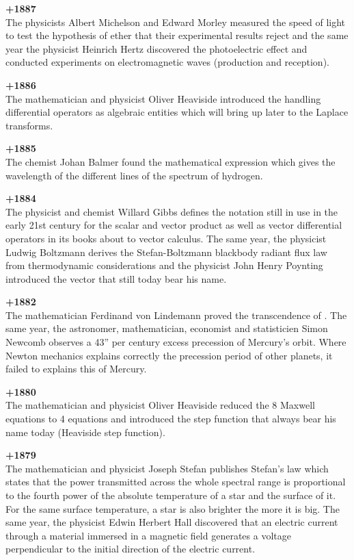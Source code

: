 \textbf{+1887}\\
The physicists Albert Michelson and Edward Morley measured the speed of light to test the hypothesis of ether that their experimental results reject and the same year the physicist Heinrich Hertz discovered the photoelectric effect and conducted experiments on electromagnetic waves (production and reception).

\textbf{+1886}\\
The mathematician and physicist Oliver Heaviside introduced the handling differential operators as algebraic entities which will bring up later to the Laplace transforms.

\textbf{+1885}\\
The chemist Johan Balmer found the mathematical expression which gives the wavelength of the different lines of the spectrum of hydrogen.

\textbf{+1884}\\
The physicist and chemist Willard Gibbs defines the notation still in use in the early 21st century for the scalar and vector product as well as vector differential operators in its books about to vector calculus. The same year, the physicist Ludwig Boltzmann derives the Stefan-Boltzmann blackbody radiant flux law from thermodynamic considerations and the physicist John Henry Poynting introduced the vector that still today bear his name.

\textbf{+1882}\\
The mathematician Ferdinand von Lindemann proved the transcendence of . The same year, the astronomer, mathematician, economist and statisticien Simon Newcomb observes a 43'' per century excess precession of Mercury's orbit. Where Newton mechanics explains correctly the precession period of other planets, it failed to explains this of Mercury.

\textbf{+1880}\\
The mathematician and physicist Oliver Heaviside reduced the 8 Maxwell equations to 4 equations and introduced the step function that always bear his name today (Heaviside step function).

\textbf{+1879}\\
The mathematician and physicist Joseph Stefan publishes Stefan's law which states that the power transmitted across the whole spectral range is proportional to the fourth power of the absolute temperature of a star and the surface of it. For the same surface temperature, a star is also brighter the more it is big. The same year, the physicist Edwin Herbert Hall discovered that an electric current through a material immersed in a magnetic field generates a voltage perpendicular to the initial direction of the electric current.

